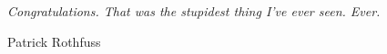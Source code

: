 \pagestyle{empty}

\vspace*{\fill}
\begingroup
    \setlength{\epigraphrule}{0pt}
    \setlength{\epigraphwidth}{0.75\textwidth}
    \epigraph{\textit{Congratulations. That was the stupidest thing I've ever seen. Ever.}}{Patrick Rothfuss}
\endgroup
\vfill
